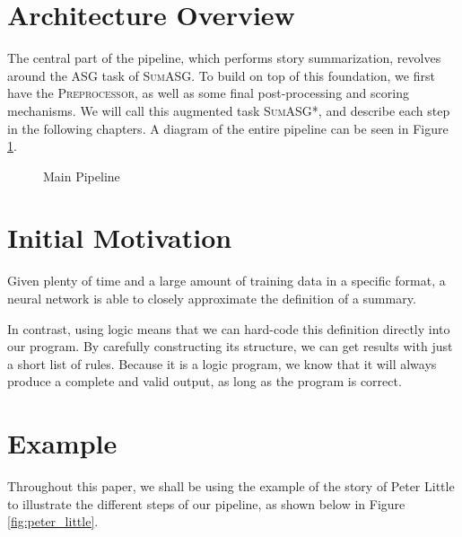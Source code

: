 \section{Architecture Overview}

The central part of the pipeline, which performs story summarization, revolves around the ASG task of \textsc{SumASG}. To build on top of this foundation, we first have the \textsc{Preprocessor}, as well as some final post-processing and scoring mechanisms. We will call this augmented task \textsc{SumASG*}, and describe each step in the following chapters. A diagram of the entire pipeline can be seen in Figure \ref{fig:main_pipeline}.

\begin{figure}[H]
\centering
{}
\caption{Main Pipeline}
\label{fig:main_pipeline}
\end{figure}

\section{Initial Motivation}

Given plenty of time and a large amount of training data in a specific format, a neural network is able to closely approximate the definition of a summary.

In contrast, using logic means that we can hard-code this definition directly into our program. By carefully constructing its structure, we can get results with just a short list of rules. Because it is a logic program, we know that it will always produce a complete and valid output, as long as the program is correct.

\section{Example}

Throughout this paper, we shall be using the example of the story of Peter Little to illustrate the different steps of our pipeline, as shown below in Figure \ref{fig:peter_little}.

